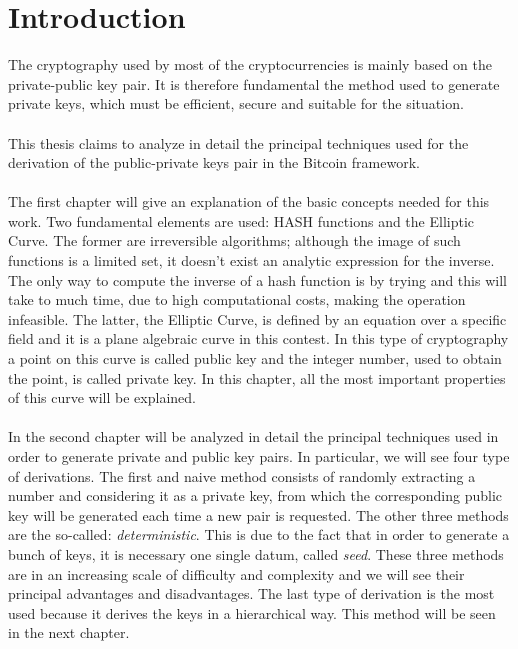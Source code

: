 
\chapter*{Introduction} %
\label{Introduction} %


The cryptography used by most of the cryptocurrencies is mainly based on the private-public key pair. It is therefore fundamental the method used to generate private keys, which must be efficient, secure and suitable for the situation.
\\ \\
This thesis claims to analyze in detail the principal techniques used for the derivation of the public-private keys pair in the Bitcoin framework.
\\ \\
The first chapter will give an explanation of the basic concepts needed for this work. Two fundamental elements are used: HASH functions and the Elliptic Curve. The former are irreversible algorithms; although the image of such functions is a limited set, it doesn't exist an analytic expression for the inverse. The only way to compute the inverse of a hash function is by trying and this will take to much time, due to high computational costs, making the operation infeasible.
The latter, the Elliptic Curve, is defined by an equation over a specific field and it is a plane algebraic curve in this contest. In this type of cryptography a point on this curve is called public key and the integer number, used to obtain the point, is called private key. In this chapter, all the most important properties of this curve will be explained.
\\ \\
In the second chapter will be analyzed in detail the principal techniques used in order to generate private and public key pairs. In particular, we will see four type of derivations. The first and naive method consists of randomly extracting a number and considering it as a private key, from which the corresponding public key will be generated each time a new pair is requested. The other three methods are the so-called: \textit{deterministic}. This is due to the fact that in order to generate a bunch of keys, it is necessary one single datum, called \textit{seed}. These three methods are in an increasing scale of difficulty and complexity and we will see their principal advantages and disadvantages. The last type of derivation is the most used because it derives the keys in a hierarchical way. This method will be seen in the next chapter.
